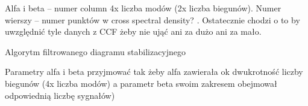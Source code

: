 Alfa i beta – numer column 4x liczba modów (2x liczba biegunów). Numer wierszy – numer punktów w cross spectral density? \parencite{caicedo_practical_2011}. Ostatecznie chodzi o to by uwzględnić tyle danych z CCF żeby nie ująć ani za dużo ani za mało.


Algorytm filtrowanego diagramu stabilizacyjnego  \parencite{caicedo_practical_2011}

Parametry alfa i beta \parencite{brownjohn_ambient_2010,caicedo_practical_2011,hollkamp_modal_2001,nayeri_study_2009,siringoringo_system_2008,szafranski_oddzialywania_2013}  przyjmować tak żeby alfa zawierała ok dwukrotność liczby biegunów (4x liczba modów) a parametr beta swoim zakresem obejmował odpowiednią liczbę sygnałów)